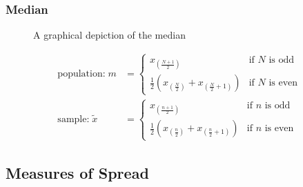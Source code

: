 \documentclass[
  a4paper,
]{scrbook}
\begin{document}
\subsubsection{Median}\label{median}

\begin{figure}[ht]


\caption{\label{fig-median-ds}A graphical depiction of the median}

\end{figure}%

\begin{align}
\text{population:} \; m &= 
\begin{cases}
x_{\left(\frac{N+1}{2}\right)} & \text{if } N \text{ is odd} \\
\frac{1}{2} \left( x_{\left(\frac{N}{2}\right)} + x_{\left(\frac{N}{2} + 1\right)} \right) & \text{if } N \text{ is even}
\end{cases} \\ 
\text{sample:} \; \tilde{x} &= 
\begin{cases}
x_{\left(\frac{n+1}{2}\right)} & \text{if } n \text{ is odd} \\
\frac{1}{2} \left( x_{\left(\frac{n}{2}\right)} + x_{\left(\frac{n}{2} + 1\right)} \right) & \text{if } n \text{ is even}
\end{cases} 
\end{align}

\subsection{Measures of Spread}\label{measures-of-spread}
\end{document}
